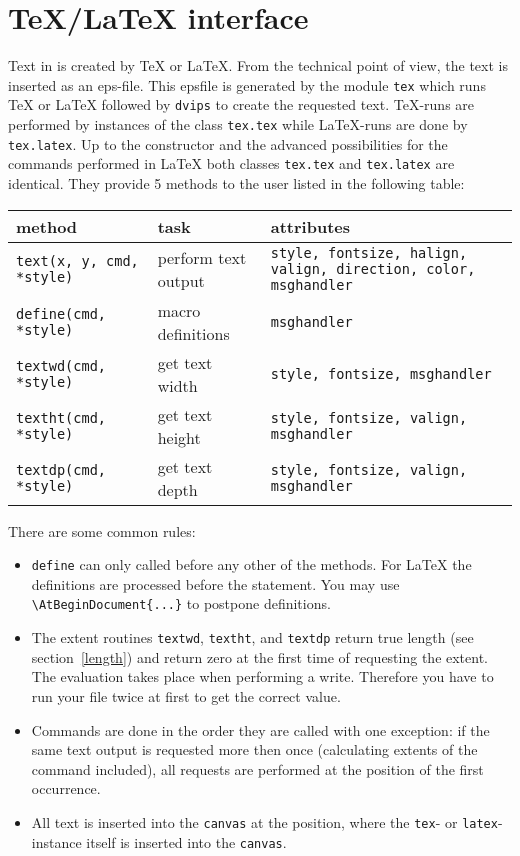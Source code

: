 \section{\TeX/\LaTeX{} interface}
\label{tex}
Text in \PyX{} is created by \TeX{} or \LaTeX. From the technical point
of view, the text is inserted as an eps-file. This epsfile is generated
by the module \verb|tex| which runs \TeX{} or \LaTeX{} followed by
\verb|dvips| to create the requested text. \TeX-runs are performed by
instances of the class \verb|tex.tex| while \LaTeX-runs are done by
\verb|tex.latex|. Up to the constructor and the advanced possibilities
for the commands performed in \LaTeX{} both classes \verb|tex.tex| and
\verb|tex.latex| are identical. They provide 5 methods to the user
listed in the following table:

\bigskip
\begin{tabularx}{\linewidth}{ll>{\raggedright\arraybackslash}X}
method&task&attributes\\
\hline
\texttt{text(x, y, cmd, *style)}&perform text output&\texttt{style, fontsize, halign, valign, direction, color, msghandler}\\
\texttt{define(cmd, *style)}&macro definitions&\texttt{msghandler}\\
\texttt{textwd(cmd, *style)}&get text width&\texttt{style, fontsize, msghandler}\\
\texttt{textht(cmd, *style)}&get text height&\texttt{style, fontsize, valign, msghandler}\\
\texttt{textdp(cmd, *style)}&get text depth&\texttt{style, fontsize, valign, msghandler}\\
\end{tabularx}
\bigskip

There are some common rules:
\begin{itemize}
\item \verb|define| can only called before any other of the methods. For
\LaTeX{} the definitions are processed before the \verb||
statement. You may use \verb|\AtBeginDocument{...}| to postpone definitions.
\item The extent routines \verb|textwd|, \verb|textht|, and
\verb|textdp| return true \PyX{} length (see section~\ref{length})
and return zero at the first time of requesting the extent. The
evaluation takes place when performing a write. Therefore you have to
run your file twice at first to get the correct value.
\item Commands are done in the order they are called with one exception:
if the same text output is requested more then once (calculating extents
of the command included), all requests are performed at the position of
the first occurrence.
\item All text is inserted into the \verb|canvas| at the position, where
the \verb|tex|- or \verb|latex|-instance itself is inserted into the
\verb|canvas|.
\end{itemize}

